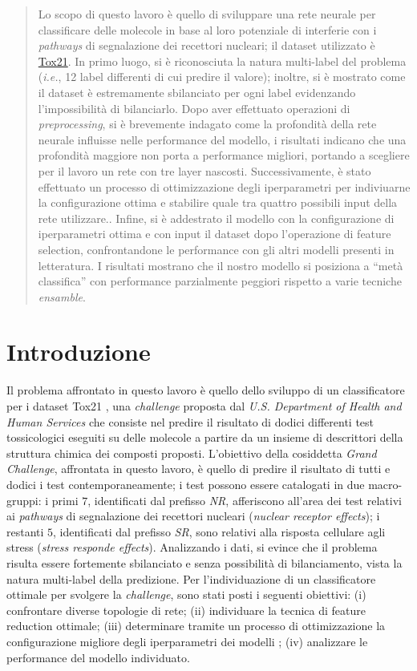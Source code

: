 \begin{abstract}
Lo scopo di questo lavoro è quello di sviluppare una rete neurale per classificare delle molecole in base al loro potenziale di interferie con i \textit{pathways} di segnalazione dei recettori nucleari; il dataset utilizzato è \href{http://bioinf.jku.at/research/DeepTox/tox21.html}{Tox21}.
In primo luogo, si è riconosciuta la natura multi-label del problema (\textit{i.e.}, 12 label differenti di cui predire il valore); inoltre, si è mostrato come il dataset è estremamente sbilanciato per ogni label evidenzando l'impossibilità di bilanciarlo.
Dopo aver effettuato operazioni di \textit{preprocessing}, si è brevemente indagato come la profondità della rete neurale influisse nelle performance del modello, i risultati indicano che una profondità maggiore non porta a performance migliori, portando a scegliere per il lavoro un rete con tre layer nascosti.
Successivamente, è stato effettuato un processo di ottimizzazione degli iperparametri per indiviuarne la configurazione ottima e stabilire quale tra quattro possibili input della rete utilizzare..
Infine, si è addestrato il modello con la configurazione di iperparametri ottima e con input il dataset dopo l'operazione di feature selection, confrontandone le performance con gli altri modelli presenti in letteratura.
I risultati mostrano che il nostro modello si posiziona a “metà classifica” con performance parzialmente peggiori rispetto a varie tecniche \textit{ensamble}.
\end{abstract}

\section{Introduzione}
Il problema affrontato in questo lavoro è quello dello sviluppo di un classificatore per i dataset Tox21 \cite{challenge_site}, una \textit{challenge} proposta dal \textit{U.S. Department of Health and Human Services} che consiste nel predire il risultato di dodici differenti test tossicologici eseguiti su delle molecole a partire da un insieme di descrittori della struttura chimica dei composti proposti.
L'obiettivo della cosiddetta \textit{Grand Challenge}, affrontata in questo lavoro, è quello di predire il risultato di tutti e dodici i test contemporaneamente; i test possono essere catalogati in due macro-gruppi: i primi $7$, identificati dal prefisso \textit{NR}, afferiscono all'area dei test relativi ai \textit{pathways} di segnalazione dei recettori nucleari (\textit{nuclear receptor effects}); i restanti $5$, identificati dal prefisso \textit{SR}, sono relativi alla risposta cellulare agli stress (\textit{stress responde effects}).
Analizzando i dati, si evince che il problema risulta essere fortemente sbilanciato e senza possibilità di bilanciamento, vista la natura multi-label della predizione.
Per l'individuazione di un classificatore ottimale per svolgere la \textit{challenge}, sono stati posti i seguenti obiettivi: (i) confrontare diverse topologie di rete; (ii) individuare la tecnica di feature reduction ottimale; (iii) determinare tramite un processo di ottimizzazione la configurazione migliore degli iperparametri dei modelli ; (iv) analizzare le performance del modello individuato.